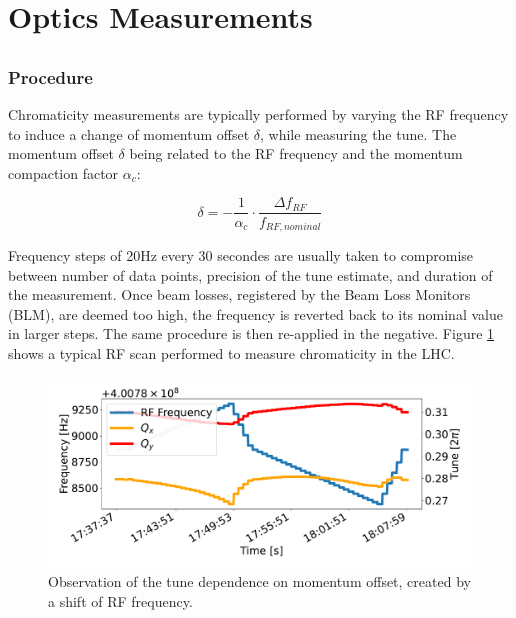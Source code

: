 \section{Optics Measurements}



\subsection{}





\subsection{}

\subsubsection{Procedure}

Chromaticity measurements are typically performed by varying the RF frequency to induce a change of
momentum offset $\delta$, while measuring the tune.  The momentum offset $\delta$ being related to
the RF frequency and the momentum compaction factor $\alpha_c$:

\begin{equation}
    \delta = - \frac{1}{\alpha_c} \cdot \frac{\Delta f_{RF}}{f_{RF,nominal}}
    \label{eq:dpp_rf}
\end{equation}

Frequency steps of 20Hz every 30 secondes are usually taken to compromise between number of data
points, precision of the tune estimate, and duration of the measurement. Once beam losses,
registered by the Beam Loss Monitors (BLM), are deemed too high, the frequency is reverted back to
its nominal value in larger steps. The same procedure is then re-applied in the negative. Figure
\ref{fig:measurements:rf_scan} shows a typical RF scan performed to measure chromaticity in the LHC.

\begin{figure}[H]
    \centering
    \includegraphics[width=1\textwidth]{images/rf_scan.pdf}
    \caption{Observation of the tune dependence on momentum offset, created by a shift of RF
             frequency.}
    \label{fig:measurements:rf_scan}
\end{figure}




